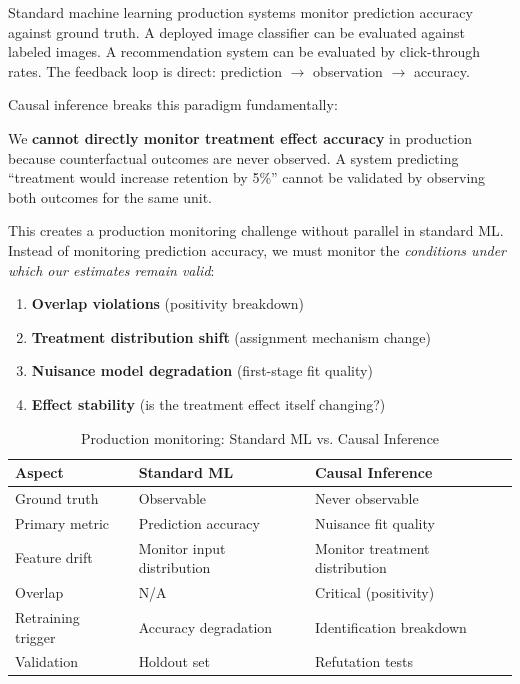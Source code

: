 Standard machine learning production systems monitor prediction accuracy against ground truth. A deployed image classifier can be evaluated against labeled images. A recommendation system can be evaluated by click-through rates. The feedback loop is direct: prediction $\rightarrow$ observation $\rightarrow$ accuracy.

Causal inference breaks this paradigm fundamentally:

\begin{keyinsight}
We \textbf{cannot directly monitor treatment effect accuracy} in production because counterfactual outcomes are never observed. A system predicting ``treatment would increase retention by 5\%'' cannot be validated by observing both outcomes for the same unit.
\end{keyinsight}

This creates a production monitoring challenge without parallel in standard ML. Instead of monitoring prediction accuracy, we must monitor the \textit{conditions under which our estimates remain valid}:

\begin{enumerate}
    \item \textbf{Overlap violations} (positivity breakdown)
    \item \textbf{Treatment distribution shift} (assignment mechanism change)
    \item \textbf{Nuisance model degradation} (first-stage fit quality)
    \item \textbf{Effect stability} (is the treatment effect itself changing?)
\end{enumerate}

\begin{table}[htbp]
\centering
\caption{Production monitoring: Standard ML vs. Causal Inference}
\label{tab:ml_vs_causal_monitoring}
\begin{tabular}{lll}
\toprule
\textbf{Aspect} & \textbf{Standard ML} & \textbf{Causal Inference} \\
\midrule
Ground truth & Observable & Never observable \\
Primary metric & Prediction accuracy & Nuisance fit quality \\
Feature drift & Monitor input distribution & Monitor treatment distribution \\
Overlap & N/A & Critical (positivity) \\
Retraining trigger & Accuracy degradation & Identification breakdown \\
Validation & Holdout set & Refutation tests \\
\bottomrule
\end{tabular}
\end{table}

